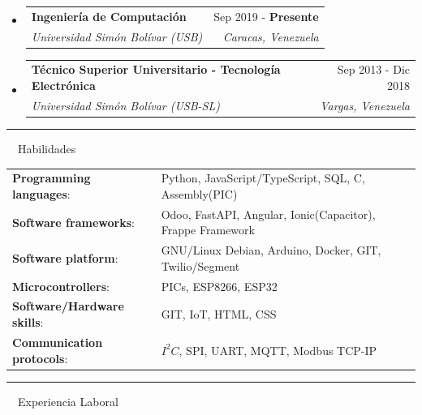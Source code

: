 \documentclass[a4paper,20pt]{article}
\makeatletter
\newcommand{\resumeItem}[2]{
  \item\small{
    \textbf{#1}{: #2 \vspace{-2pt}}
  }
}
\newcommand{\resumeSubheading}[4]{
  \vspace{-1pt}\item
    \begin{tabular*}{0.97\textwidth}{l@{\extracolsep{\fill}}r}
      \textbf{#1} & #2 \\
      \textit{#3} & \textit{#4} \\
    \end{tabular*}\vspace{-5pt}
}
\newcommand{\resumeSubItem}[2]{\resumeItem{#1}{#2}\vspace{-3pt}}
\newcommand{\resumeSubHeadingListStart}{\begin{itemize}[leftmargin=*]}
\newcommand{\resumeSubHeadingListEnd}{\end{itemize}}
\makeatother
\begin{document}
  \resumeSubHeadingListStart
    \resumeSubheading
    {Ingeniería de Computación}{Sep 2019 - {\textbf{Presente}}}
      {Universidad Simón Bolívar (USB)}{Caracas, Venezuela}
    \resumeSubHeadingListEnd
    
   \resumeSubHeadingListStart
    \resumeSubheading
    {Técnico Superior Universitario - Tecnología Electrónica}{Sep 2013 - Dic 2018}
      {Universidad Simón Bolívar (USB-SL)}{Vargas, Venezuela}
    \resumeSubHeadingListEnd
	    
\vspace{10pt}
 \textcolor{NavyBlue}{ \rule[1mm]{2cm}{2mm} {\LARGE ~~Habilidades}}
\vspace{2pt}


\resumeSubHeadingListStart

\begin{tabular}{ m{60mm} m{100mm}}
\resumeSubItem{Programming languages}{}&Python, JavaScript/TypeScript, SQL, C, Assembly(PIC)\\
\vspace{4pt}
\resumeSubItem{Software frameworks}{}&Odoo, FastAPI, Angular, Ionic(Capacitor), Frappe Framework\\
\vspace{4pt}
\resumeSubItem{Software platform}{}&GNU/Linux Debian, Arduino, Docker, GIT, Twilio/Segment\\
\vspace{4pt}
\resumeSubItem{Microcontrollers}{}&PICs, ESP8266, ESP32\\
\vspace{4pt}
\resumeSubItem{Software/Hardware skills}{}&GIT, IoT, HTML, CSS\\
\vspace{4pt}
\resumeSubItem{Communication protocols}{}&$I^{2}C$, SPI, UART, MQTT, Modbus TCP-IP\\
\end{tabular}	

\resumeSubHeadingListEnd



\vspace{10pt}
 \textcolor{NavyBlue}{ \rule[1mm]{2cm}{2mm} {\LARGE ~~Experiencia Laboral}}
\vspace{2pt}
\end{document}
